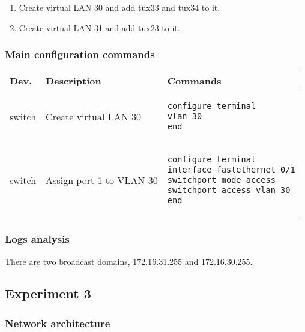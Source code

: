 \documentclass[a4paper, 11pt]{report}
\begin{document}
\begin{enumerate}
    \item Create virtual LAN 30 and add tux33 and tux34 to it.
    \item Create virtual LAN 31 and add tux23 to it.
\end{enumerate}

\subsubsection{Main configuration commands} \label{sec:Com2}

\begin{tabular}{l | p{75mm} | l}
    \textbf{Dev.} & \textbf{Description}                                  & \textbf{Commands}                       \\ \hline
    switch        & Create virtual LAN 30                                 &
        \begin{lstlisting}[frame=none, numbers=none, language=sh]
configure terminal
vlan 30
end
        \end{lstlisting} \\
    switch        & Assign port 1 to VLAN 30                              & 
        \begin{lstlisting}[frame=none, numbers=none, language=sh]
configure terminal
interface fastethernet 0/1
switchport mode access
switchport access vlan 30
end
        \end{lstlisting} \\
\end{tabular}

\subsubsection{Logs analysis} \label{sec:Log2}

There are two broadcast domains, 172.16.31.255 and 172.16.30.255.

\subsection{Experiment 3} \label{sec:Exp3}
\subsubsection{Network architecture} \label{sec:Arc3}
\end{document}
